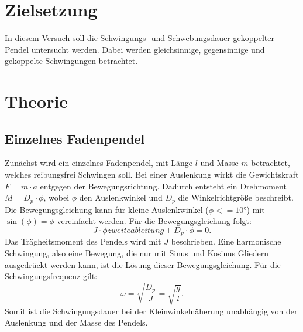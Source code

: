 \section{Zielsetzung}
In diesem Versuch soll die Schwingungs- und Schwebungsdauer gekoppelter Pendel untersucht werden.
Dabei werden gleichsinnige, gegensinnige und gekoppelte Schwingungen betrachtet.
\section{Theorie}
\label{sec:Theorie}
\subsection{Einzelnes Fadenpendel}
Zunächst wird ein einzelnes Fadenpendel, mit Länge $l$ und Masse $m$ betrachtet,
welches reibungsfrei Schwingen soll.
Bei einer Auslenkung wirkt die Gewichtskraft $F = m \cdot a$ entgegen der Bewegungsrichtung.
Dadurch entsteht ein Drehmoment $M = D_p \cdot \phi$, wobei $\phi$ den Auslenkwinkel und $D_p$ die Winkelrichtgröße beschreibt.
Die Bewegungsgleichung kann für kleine Auslenkwinkel ($\phi <= 10°$) mit $\sin(\phi)= \phi$ vereinfacht werden.
Für die Bewegungsgleichung folgt:
\begin{equation*}
    J \cdot \phi zweite ableitung + D_p \cdot \phi = 0.
\end{equation*}
Das Trägheitsmoment des Pendels wird mit $J$ beschrieben.
Eine harmonische Schwingung, also eine Bewegung, die nur mit Sinus und Kosinus Gliedern ausgedrückt werden kann, ist die Lösung dieser Bewegungsgleichung.
Für die Schwingungsfrequenz gilt:
\begin{equation*}
    \omega = \sqrt{\frac{D_p}{J}} = \sqrt{\frac{g}{l}}.
\end{equation*}
Somit ist die Schwingungsdauer bei der Kleinwinkelnäherung unabhängig von der Auslenkung und der Masse des Pendels.

